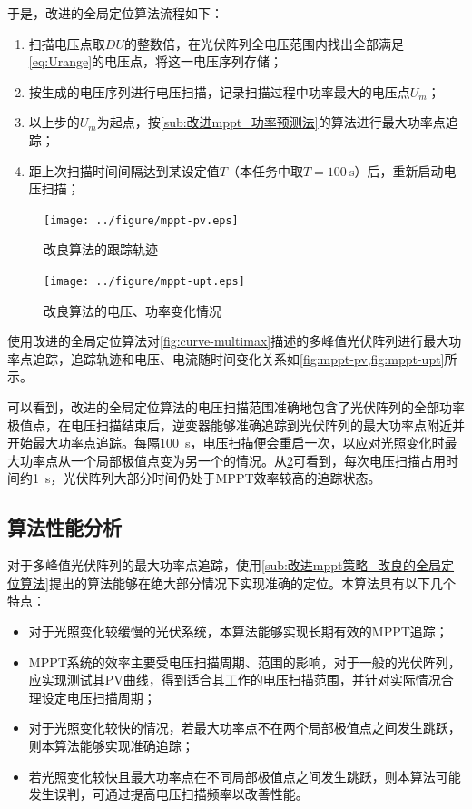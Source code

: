 \documentclass[a4paper,12pt]{article}
\begin{document}
    于是，改进的全局定位算法流程如下：
    \begin{enumerate}
      \item 扫描电压点取$DU$的整数倍，在光伏阵列全电压范围内找出全部满足\cref{eq:Urange}的电压点，将这一电压序列存储；
      \item 按生成的电压序列进行电压扫描，记录扫描过程中功率最大的电压点$U_m$；
      \item 以上步的$U_m$为起点，按\cref{sub:改进mppt_功率预测法}的算法进行最大功率点追踪；
      \item 距上次扫描时间间隔达到某设定值$T$（本任务中取$T=\SI{100}{\second}$）后，重新启动电压扫描；
    \end{enumerate}
    \begin{figure}[htbp]
        \centering
        \texttt{[image: ../figure/mppt-pv.eps]}
        \caption{改良算法的跟踪轨迹}
        \label{fig:mppt-pv}
    \end{figure}
    \begin{figure}[htbp]
        \centering
        \texttt{[image: ../figure/mppt-upt.eps]}
        \caption{改良算法的电压、功率变化情况}
        \label{fig:mppt-upt}
    \end{figure}

    使用改进的全局定位算法对\cref{fig:curve-multimax}描述的多峰值光伏阵列进行最大功率点追踪，追踪轨迹和电压、电流随时间变化关系如\cref{fig:mppt-pv,fig:mppt-upt}所示。

    可以看到，改进的全局定位算法的电压扫描范围准确地包含了光伏阵列的全部功率极值点，在电压扫描结束后，逆变器能够准确追踪到光伏阵列的最大功率点附近并开始最大功率点追踪。每隔\SI{100}{\second}，电压扫描便会重启一次，以应对光照变化时最大功率点从一个局部极值点变为另一个的情况。从\cref{fig:mppt-upt}可看到，每次电压扫描占用时间约\SI{1}{\second}，光伏阵列大部分时间仍处于MPPT效率较高的追踪状态。
    
    \subsection{算法性能分析} %
    \label{sub:算法性能分析2}
    对于多峰值光伏阵列的最大功率点追踪，使用\cref{sub:改进mppt策略_改良的全局定位算法}提出的算法能够在绝大部分情况下实现准确的定位。本算法具有以下几个特点：
    \begin{itemize}
      \item 对于光照变化较缓慢的光伏系统，本算法能够实现长期有效的MPPT追踪；
      \item MPPT系统的效率主要受电压扫描周期、范围的影响，对于一般的光伏阵列，应实现测试其PV曲线，得到适合其工作的电压扫描范围，并针对实际情况合理设定电压扫描周期；
      \item 对于光照变化较快的情况，若最大功率点不在两个局部极值点之间发生跳跃，则本算法能够实现准确追踪；
      \item 若光照变化较快且最大功率点在不同局部极值点之间发生跳跃，则本算法可能发生误判，可通过提高电压扫描频率以改善性能。
    \end{itemize}
    
\end{document}
